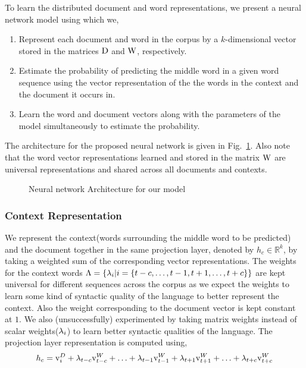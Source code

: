 To learn the distributed document and word representations, we present a neural network model using which we,
\begin{enumerate}
\item Represent each document and word in the corpus by a $k$-dimensional vector stored in the matrices $\mathrm{D}$ and $\mathrm{W}$, respectively.
\item Estimate the probability of predicting the middle word in a given word sequence using the vector representation of the the words in the context and the document it occurs in.
\item Learn the word and document vectors along with the parameters of the model simultaneously to estimate the probability.
\end{enumerate}
The architecture for the proposed neural network is given in Fig.~\ref{fig:nn:archi}.
Also note that the word vector representations learned and stored in the matrix $\mathrm{W}$ are universal representations and shared across all documents and contexts.
\begin{figure}[h!]
    \centering
        
    \caption{Neural network Architecture for our model}
    \label{fig:nn:archi}
\end{figure}

\subsubsection{Context Representation}
We represent the context(words surrounding the middle word to be predicted) and the document together in the same projection layer, denoted by $h_{c} \in \mathbb{R}^{k}$, by taking a weighted sum of the corresponding vector representations. 
The weights for the context words $\Lambda = \{\lambda_{i} | i=\{t-c, \ldots, t-1, t+1, \ldots, t+c\}\}$ are kept universal for different sequences across the corpus as we expect the weights to learn some kind of syntactic quality of the language to better represent the context. Also the weight corresponding to the document vector is kept constant at $1$. 
We also (unsuccessfully) experimented by taking matrix weights instead of scalar weights($\lambda_{i}$) to learn better syntactic qualities of the language. 
The projection layer representation is computed using,
\begin{equation}
\label{eq:hidden_vec}
h_{c} = \mathrm{v}^{D}_{i} + \lambda_{t-c}\mathrm{v}^{W}_{t-c} + \ldots + \lambda_{t-1}\mathrm{v}^{W}_{t-1} + \lambda_{t+1}\mathrm{v}^{W}_{t+1} + \ldots + \lambda_{t+c}\mathrm{v}^{W}_{t+c}
\end{equation}

